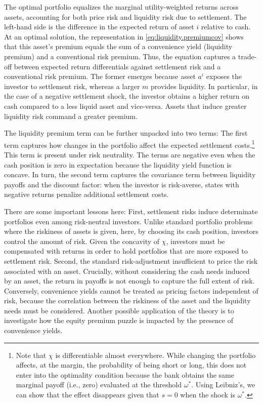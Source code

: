 \documentclass[12pt,american,english,notitlepage]{article}
\begin{document}
The optimal portfolio equalizes the marginal utility-weighted returns across assets, accounting for both price risk and liquidity risk due to settlement.
The left-hand side is the difference in the expected return of asset
$i$ relative to cash. At an optimal solution, the representation
in \eqref{eq:liquidity.premiumcov} shows that this asset's premium
equals the sum of a convenience yield (liquidity premium) and a conventional
risk premium. Thus, the equation captures a trade-off between expected
return differentials against settlement risk and a conventional risk
premium. The former emerges because asset $a^{i}$ exposes the investor
to settlement risk, whereas a larger $m$ provides liquidity. In particular,
in the case of a negative settlement shock, the investor obtains a
higher return on cash compared to a less liquid asset and vice-versa.
Assets that induce greater liquidity risk command a greater premium.

The liquidity premium term can be further unpacked into two terms:
The first term captures how changes in the portfolio affect the expected
settlement costs.\footnote{Note that $\chi$ is differentiable almost everywhere. While changing the portfolio affects, at the margin, the probability
of being short or long, this does not enter into the optimality condition
because the bank obtains the same marginal payoff (i.e., zero) evaluated
at the threshold $\omega^{\ast}$. Using Leibniz's, we can show that
the effect disappears given that $s=0$ when the shock is $\omega^{\ast}$.} This term is present under risk neutrality. The terms are negative
even when the cash position is zero in expectation because the liquidity
yield function is concave. In turn, the second term captures
the covariance term between liquidity payoffs and the discount factor: when the investor is risk-averse, states with negative returns penalize
additional settlement costs.

There are some important lessons here: First, settlement risks induce
determinate portfolios even among risk-neutral investors. Unlike standard
portfolio problems where the riskiness of assets is given, here, by
choosing its cash position, investors control the amount of risk.
Given the concavity of $\chi$, investors must be compensated with
returns in order to hold portfolios that are more exposed to settlement
risk. Second, the standard risk-adjustment 
insufficient to price the risk associated with an asset. Crucially,
without considering the cash needs induced by an
asset, the return in payoffs is not enough to capture the full extent
of risk. Conversely, convenience yields cannot be treated as pricing
factors independent of risk, because the correlation between the riskiness
of the asset and the liquidity needs must be considered. Another possible
application of the theory is to investigate how the equity premium
puzzle \citep{MERH/PRES/85} is impacted by the presence of convenience
yields.
\end{document}
